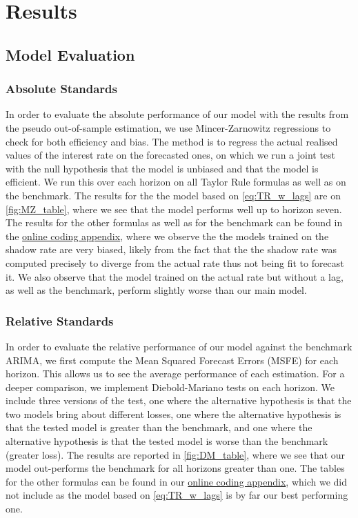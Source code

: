\section{Results}\label{sec:res}


\subsection{Model Evaluation}

\subsubsection{Absolute Standards}

In order to evaluate the absolute performance of our model with the results from the pseudo out-of-sample
estimation, we use Mincer-Zarnowitz regressions \citep{mincer1969evaluation} to check for both efficiency and bias. The method is to regress the actual realised values of the interest rate on the forecasted ones, on which we run a joint test with the null hypothesis that the model is unbiased and that the model is efficient. We run this over each horizon on all Taylor Rule formulas as well as on the benchmark. The results for the the model based on \eqref{eq:TR_w_lags} are on \autoref{fig:MZ_table}, where we see that the model performs well up to horizon seven. The results for the other formulas as well as for the benchmark can be found in the \href{https://github.com/theshufflebee/therockcast/blob/main/ECB_Project.pdf}{online coding appendix}, where we observe the the models trained on the shadow rate are very biased, likely from the fact that the the shadow rate was computed precisely to diverge from the actual rate thus not being fit to forecast it. We also observe that the model trained on the actual rate but without a lag, as well as the benchmark, perform slightly worse than our main model.


\subsubsection{Relative Standards}

In order to evaluate the relative performance of our model against the benchmark ARIMA, we first compute the Mean Squared Forecast Errors (MSFE) for each horizon. This allows us to see the average performance of each estimation. For a deeper comparison, we implement Diebold-Mariano tests \citep{diebold1995comparing} on each horizon. We include three versions of the test, one where the alternative hypothesis is that the two models bring about different losses, one where the alternative hypothesis is that the tested model is greater than the benchmark, and one where the alternative hypothesis is that the tested model is worse than the benchmark (greater loss). The results are reported in \autoref{fig:DM_table}, where we see that our model out-performs the benchmark for all horizons greater than one. The tables for the other formulas can be found in our \href{https://github.com/theshufflebee/therockcast/blob/main/ECB_Project.pdf}{online coding appendix}, which we did not include as the model based on \eqref{eq:TR_w_lags} is by far our best performing one.


